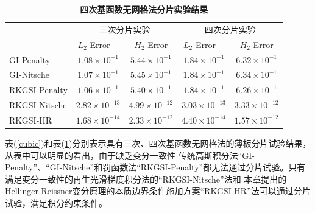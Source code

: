 \begin{table}[H]
    \caption{\textbf{四次基函数无网格法分片实验结果}}
    \centering\label{quartic}
   \begin{tabular}{lcccc}
   \toprule
   & \multicolumn{2}{c}{三次分片实验} & \multicolumn{2}{c}{四次分片实验} \\ \cline{2-5}
   &$L_2$-Error$\quad$&$H_2$-Error&$L_2$-Error$\quad$&$H_2$-Error\\
   \midrule
   GI-Penalty&$1.08\times10^{-1}$&$5.44\times10^{-1}$&$1.84\times10^{-1}$&$6.32\times10^{-1}$\\
   GI-Nitsche&$1.07\times10^{-1}$&$5.45\times10^{-1}$&$1.84\times10^{-1}$&$6.34\times10^{-1}$\\
  RKGSI-Penalty&$1.06\times10^{-1}$&$5.40\times10^{-1}$&$1.84\times10^{-1}$&$6.26\times10^{-1}$\\
  RKGSI-Nitsche&$2.82\times10^{-13}$&$4.99\times10^{-12}$&$3.03\times10^{-13}$&$3.33\times10^{-12}$\\
  RKGSI-HR&$1.68\times10^{-14}$&$2.33\times10^{-12}$&$4.40\times10^{-14}$&$1.57\times10^{-12}$\\
\bottomrule
\end{tabular}
\end{table}\par
表(\ref{cubic})和表(\ref{quartic})分别表示具有三次、四次基函数无网格法的薄板分片试验结果，从表中可以明显的看出，由于缺乏变分一致性
传统高斯积分法“GI-Penalty”、“GI-Nitsche”和罚函数法“RKGSI-Penalty”都无法通过分片试验。只有满足变分一致性的再生光滑梯度积分法的“RKGSI-Nitsche”法和
本章提出的Hellinger-Reissner变分原理的本质边界条件施加方案“RKGSI-HR”法可以通过分片试验，满足积分约束条件。

